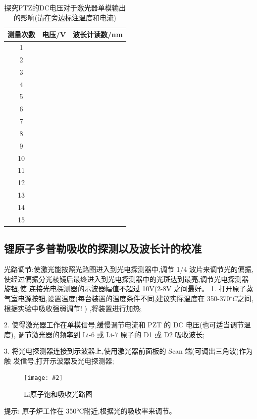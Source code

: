 \documentclass[10pt,a4paper]{ctexart}
\newcommand{\cpic}[2]{
\begin{center}
\texttt{[image: \#2]}
\end{center}
}
\newcommand{\cpicn}[3]
{
\begin{figure}[H]
\cpic{#1}{#2}
\caption{\color{red}#3\label{#2}}
\end{figure}
}
\begin{document}
\begin{table}[H]
\begin{center}
    \caption{探究PTZ的DC电压对于激光器单模输出的影响(请在旁边标注温度和电流)}
    \begin{tabular}{|c|l|l|}
\hline
测量次数 & 电压/V & 波长计读数/nm \\ \hline
1    &       &          \\ \hline
2    &       &          \\ \hline
3    &       &          \\ \hline
4    &       &          \\ \hline
5    &       &          \\ \hline
6    &       &          \\ \hline
7    &       &          \\ \hline
8    &       &          \\ \hline
9    &       &          \\ \hline
10   &       &          \\ \hline
11   &       &          \\ \hline
12   &       &          \\ \hline
13   &       &          \\ \hline
14   &       &          \\ \hline
15   &       &          \\ \hline
\end{tabular}
\end{center}
\end{table}
\subsection{锂原子多普勒吸收的探测以及波长计的校准}
光路调节:使激光能按照光路图进入到光电探测器中,调节 1/4 波片来调节光的偏振,使经过偏振分光棱镜后最终进入到光电探测器中的光斑达到最亮,调节光电探测器旋钮,使
连接光电探测器的示波器幅值不超过 10V(2-8V 之间最好。
1. 打开原子蒸气室电源按钮,设置温度(每台装置的温度条件不同,建议实际温度在
350-370$^\circ C$之间,根据实验中吸收强弱调节!
)
,将装置进行加热;

2. 使得激光器工作在单模信号,缓慢调节电流和 PZT 的 DC 电压(也可适当调节温度),
调节激光器的频率到 Li-6 或 Li-7 原子的 D1 或 D2 吸收波长;

3. 将光电探测器连接到示波器上,使用激光器前面板的 Scan 端(可调出三角波)作为触
发信号,打开示波器及光电探测器;
\cpicn{0.3}{absorb}{Li原子饱和吸收光路图}
提示: 原子炉工作在 350°C附近,根据光的吸收率来调节。
\end{document}
